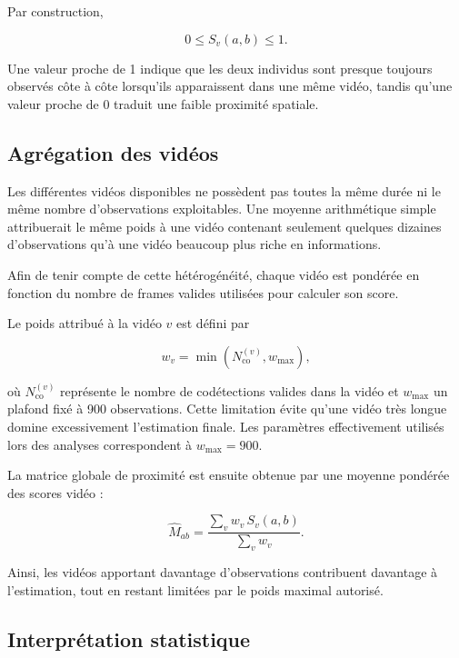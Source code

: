 \documentclass[11pt,a4paper]{report}
\begin{document}
Par construction,

\begin{equation}
0\leq S_v(a,b)\leq1.
\end{equation}

Une valeur proche de 1 indique que les deux individus sont presque toujours
observés côte à côte lorsqu'ils apparaissent dans une même vidéo, tandis qu'une
valeur proche de 0 traduit une faible proximité spatiale.

\subsection*{Agrégation des vidéos}

Les différentes vidéos disponibles ne possèdent pas toutes la même durée ni le
même nombre d'observations exploitables. Une moyenne arithmétique simple
attribuerait le même poids à une vidéo contenant seulement quelques dizaines
d'observations qu'à une vidéo beaucoup plus riche en informations.

Afin de tenir compte de cette hétérogénéité, chaque vidéo est pondérée en
fonction du nombre de frames valides utilisées pour calculer son score.

Le poids attribué à la vidéo $v$ est défini par

\begin{equation}
w_v
=
\min
\left(
N_{\mathrm{co}}^{(v)},
w_{\max}
\right),
\end{equation}

où $N_{\mathrm{co}}^{(v)}$ représente le nombre de codétections valides dans la
vidéo et $w_{\max}$ un plafond fixé à 900 observations. Cette limitation évite
qu'une vidéo très longue domine excessivement l'estimation finale. Les
paramètres effectivement utilisés lors des analyses correspondent à
$w_{\max}=900$. 

La matrice globale de proximité est ensuite obtenue par une moyenne pondérée des
scores vidéo :

\begin{equation}
\widehat{M}_{ab}
=
\frac{
\displaystyle\sum_v
w_v\,S_v(a,b)}
{
\displaystyle\sum_v
w_v
}.
\end{equation}

Ainsi, les vidéos apportant davantage d'observations contribuent davantage à
l'estimation, tout en restant limitées par le poids maximal autorisé.

\subsection*{Interprétation statistique}
\end{document}
